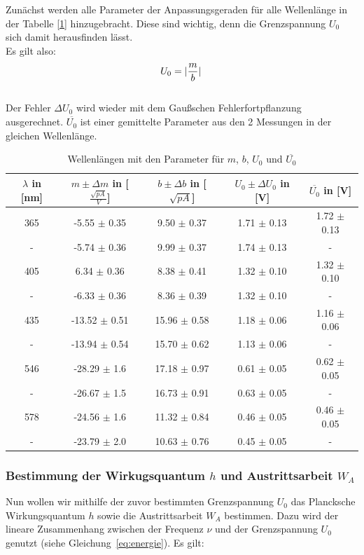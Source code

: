 \documentclass{article}
\begin{document}
Zunächst werden alle Parameter der Anpassungsgeraden für alle Wellenlänge in der Tabelle [\ref*{tab:wellenlaengen_trennstrich_m_b_U_gemittelt}]
hinzugebracht. Diese sind wichtig, denn die Grenzspannung $U_0$ sich damit herausfinden lässt. 
\\Es gilt also: 
\begin{equation}
  U_0 = \abs*{\frac{m}{b}}
\end{equation}
\\ Der Fehler $\Delta U_0$ wird wieder mit dem Gaußschen Fehlerfortpflanzung ausgerechnet. 
$\overline{U_0}$ ist einer gemittelte Parameter aus den 2 Messungen in der gleichen Wellenlänge.
\begin{table}[h!]
  \centering
  \begin{tabular}{|c|c|c|c|c|}
  \hline
  $\lambda$ in [nm] & $m \pm \Delta m$ in [$\frac{\sqrt{pA}}{V}$] & $b \pm \Delta b$ in [$\sqrt{pA}$] & $U_0 \pm \Delta U_0$ in [V] &  $\overline{U_0}$ in [V] \\ \hline
  365 & -5.55 $\pm$ 0.35 & 9.50 $\pm$ 0.37 & 1.71 $\pm$ 0.13 & 1.72 $\pm$ 0.13 \\ \hline
  - & -5.74 $\pm$ 0.36 & 9.99 $\pm$ 0.37 & 1.74 $\pm$ 0.13 & - \\ \hline
  405 & 6.34 $\pm$ 0.36 & 8.38 $\pm$ 0.41 & 1.32 $\pm$ 0.10 & 1.32 $\pm$ 0.10 \\ \hline
  - & -6.33 $\pm$ 0.36 & 8.36 $\pm$ 0.39 & 1.32 $\pm$ 0.10 & - \\ \hline
  435 & -13.52 $\pm$ 0.51 & 15.96 $\pm$ 0.58 & 1.18 $\pm$ 0.06 & 1.16 $\pm$ 0.06 \\ \hline
  - & -13.94 $\pm$ 0.54 & 15.70 $\pm$ 0.62 & 1.13 $\pm$ 0.06 & - \\ \hline
  546 & -28.29 $\pm$ 1.6 & 17.18 $\pm$ 0.97 & 0.61 $\pm$ 0.05 & 0.62 $\pm$ 0.05 \\ \hline
  - & -26.67 $\pm$ 1.5 & 16.73 $\pm$ 0.91 & 0.63 $\pm$ 0.05 & - \\ \hline
  578 & -24.56 $\pm$ 1.6 & 11.32 $\pm$ 0.84 & 0.46 $\pm$ 0.05 & 0.46 $\pm$ 0.05 \\ \hline
  - & -23.79 $\pm$ 2.0 & 10.63 $\pm$ 0.76 & 0.45 $\pm$ 0.05 & - \\ \hline
  \end{tabular}
  \caption{Wellenlängen mit den Parameter für $m$, $b$, $U_0$ und  $\overline{U_0}$}
  \label{tab:wellenlaengen_trennstrich_m_b_U_gemittelt}
\end{table}
\clearpage
\subsubsection*{Bestimmung der Wirkugsquantum $h$ und Austrittsarbeit $W_A$}
Nun wollen wir mithilfe der zuvor bestimmten Grenzspannung \( U_0 \) das Plancksche Wirkungsquantum \( h \) 
sowie die Austrittsarbeit \( W_A \) bestimmen. Dazu wird der lineare Zusammenhang zwischen der Frequenz \( \nu \) und der 
Grenzspannung \( U_0 \) genutzt (siehe Gleichung~\ref*{eq:energie}). Es gilt:
\end{document}
